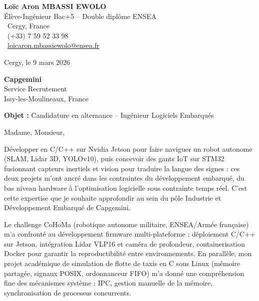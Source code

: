 \documentclass[a4paper,11pt]{article}
\begin{document}
\noindent
\begin{minipage}[t]{0.5\textwidth}
    \textbf{Loïc Aron MBASSI EWOLO}\\
    Élève-Ingénieur Bac+5 -- Double diplôme ENSEA\\[3pt]
    \faMapMarker\ Cergy, France\\
    \faPhone\ (+33) 7 59 52 33 98\\
    \faEnvelope\ \href{mailto:loicaron.mbassiewolo@ensea.fr}{loicaron.mbassiewolo@ensea.fr}
\end{minipage}
\hfill
\begin{minipage}[t]{0.4\textwidth}
    \raggedleft
    Cergy, le 9 mars 2026
\end{minipage}

\vspace{1.2cm}

\hfill
\begin{minipage}[t]{0.5\textwidth}
    \raggedleft
    \textbf{Capgemini}\\
    Service Recrutement\\
    Issy-les-Moulineaux, France
\end{minipage}

\vspace{1cm}

\noindent\textbf{Objet :} Candidature en alternance -- Ingénieur Logiciels Embarqués

\vspace{0.8cm}

Madame, Monsieur,

Développer en C/C++ sur Nvidia Jetson pour faire naviguer un robot autonome (SLAM, Lidar 3D, YOLOv10), puis concevoir des gants IoT sur STM32 fusionnant capteurs inertiels et vision pour traduire la langue des signes : ces deux projets m'ont ancré dans les contraintes du développement embarqué, du bas niveau hardware à l'optimisation logicielle sous contrainte temps réel. C'est cette expertise que je souhaite approfondir au sein du pôle Industrie et Développement Embarqué de Capgemini.

Le challenge CoHoMa (robotique autonome militaire, ENSEA/Armée française) m'a confronté au développement firmware multi-plateforme : déploiement C/C++ sur Jetson, intégration Lidar VLP16 et caméra de profondeur, containerisation Docker pour garantir la reproductibilité entre environnements. En parallèle, mon projet académique de simulation de flotte de taxis en C sous Linux (mémoire partagée, signaux POSIX, ordonnanceur FIFO) m'a donné une compréhension fine des mécanismes système : IPC, gestion manuelle de la mémoire, synchronisation de processus concurrents.
\end{document}
